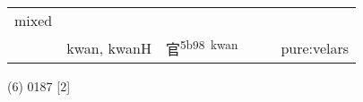 \documentclass[14pt,a4paper]{scrartcl}
\begin{document}
\begin{longtable}[c]{@{}llllll@{}}
\begin{minipage}[t]{0.14\columnwidth}\raggedright\strut
mixed
\strut\end{minipage}\tabularnewline
\begin{minipage}[t]{0.14\columnwidth}\raggedright\strut
𡧺
\strut\end{minipage} &
\begin{minipage}[t]{0.14\columnwidth}\raggedright\strut
kwan, kwanH
\strut\end{minipage} &
\begin{minipage}[t]{0.14\columnwidth}\raggedright\strut
官\textsuperscript{5b98~kwan}
\strut\end{minipage} &
\begin{minipage}[t]{0.14\columnwidth}\raggedright\strut
\strut\end{minipage} &
\begin{minipage}[t]{0.14\columnwidth}\raggedright\strut
\strut\end{minipage} &
\begin{minipage}[t]{0.14\columnwidth}\raggedright\strut
pure:velars
\strut\end{minipage}\tabularnewline
\bottomrule
\end{longtable}

(6) 0187 {[}2{]}
\end{document}

